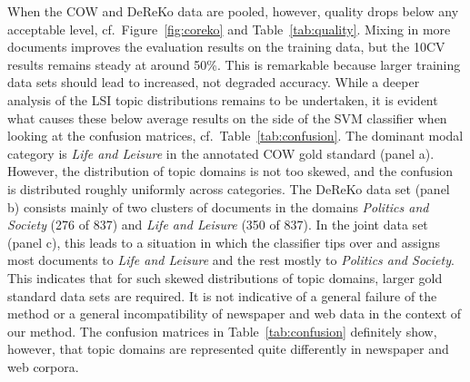 \documentclass[11pt]{article}
\begin{document}
When the COW and DeReKo data are pooled, however, quality drops below any acceptable level, cf.\ Figure~\ref{fig:coreko} and Table~\ref{tab:quality}.
Mixing in more documents improves the evaluation results on the training data, but the 10CV results remains steady at around 50\%.
This is remarkable because larger training data sets should lead to increased, not degraded accuracy.
While a deeper analysis of the LSI topic distributions remains to be undertaken, it is evident what causes these below average results on the side of the SVM classifier when looking at the confusion matrices, cf.\ Table~\ref{tab:confusion}.
The dominant modal category is \textit{Life and Leisure} in the annotated COW gold standard (panel a).
However, the distribution of topic domains is not too skewed, and the confusion is distributed roughly uniformly across categories.
The DeReKo data set (panel b) consists mainly of two clusters of documents in the domains \textit{Politics and Society} (276 of 837) and \textit{Life and Leisure} (350 of 837).
In the joint data set (panel c), this leads to a situation in which the classifier tips over and assigns most documents to \textit{Life and Leisure} and the rest mostly to \textit{Politics and Society}.
This indicates that for such skewed distributions of topic domains, larger gold standard data sets are required.
It is not indicative of a general failure of the method or a general incompatibility of newspaper and web data in the context of our method.
The confusion matrices in Table~\ref{tab:confusion} definitely show, however, that topic domains are represented quite differently in newspaper and web corpora.
\end{document}
